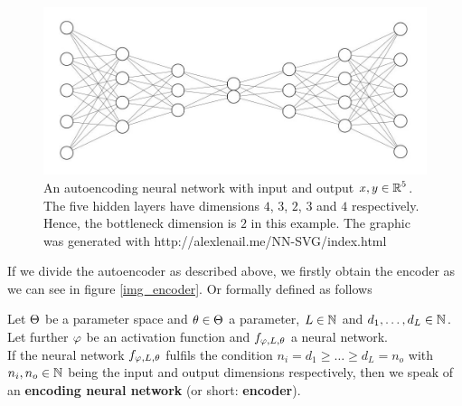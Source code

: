 \begin{figure}[H]
\begin{center}
   \begin{minipage}[b]{0.9\linewidth}
      \includegraphics[width=\linewidth]{autoencoder}
      \caption{An autoencoding neural network with input and output $x, y\in \operatorname{\mathbb{R}}^5$. The five hidden layers have dimensions $4$, $3$, $2$, $3$ and $4$ respectively. Hence, the bottleneck dimension is $2$ in this example. The graphic was generated with http://alexlenail.me/NN-SVG/index.html}\label{autoencoder}
	\end{minipage}
\end{center}
\end{figure}


If we divide the autoencoder as described above, we firstly obtain the encoder as we can see in figure \ref{img_encoder}. Or formally defined as follows

\begin{lemma}\label{def_encoder}
Let $\operatorname{\Theta}$ be a parameter space and $\theta \in \operatorname{\Theta}$ a parameter, $L\in \operatorname{\mathbb{N}}$ and $d_1,\ldots, d_L\in\operatorname{\mathbb{N}}$. Let further $\operatorname{\varphi}$ be an activation function and $f_{\operatorname{\varphi},L,\theta}$ a neural network.\\
If the neural network $f_{\operatorname{\varphi},L,\theta}$ fulfils the condition $n_i= d_1 \geq \ldots \geq d_L = n_o$ with $n_i, n_o \in \operatorname{\mathbb{N}}$ being the input and output dimensions respectively, then we speak of an \textbf{encoding neural network} (or short: \textbf{encoder}).
\end{lemma}


